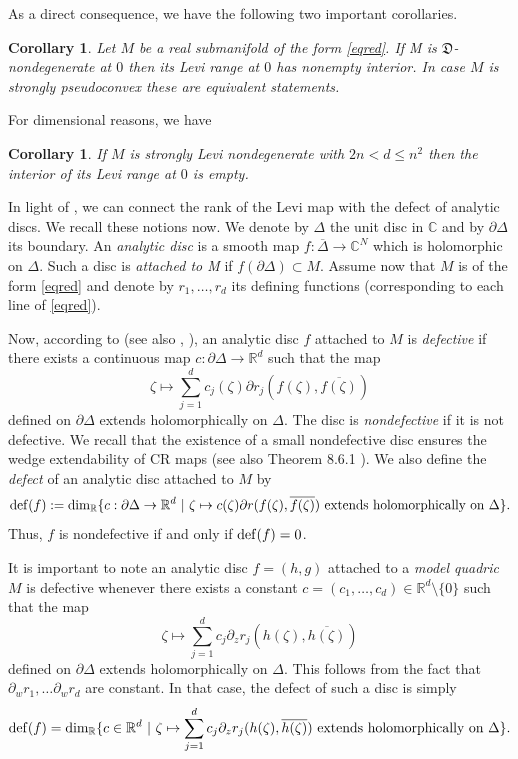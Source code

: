 \documentclass[12pt]{amsart}
\newcommand{\C}{\mathbb C}
\newcommand{\R}{\mathbb R}
\newtheorem{cor}[theo]{Corollary}
\theoremstyle{remark}
\theoremstyle{example}
\theoremstyle{definition}
\numberwithin{equation}{section}
\begin{document}
As a direct consequence, we have the following two important corollaries. 
\begin{cor}
Let  $M$ be a   real submanifold of the form \eqref{eqred}. If M is $\mathfrak{D}$-nondegenerate at $0$  then its Levi range at $0$ has nonempty interior. In case $M$ is strongly pseudoconvex these are equivalent statements.
\end{cor}

For dimensional reasons, we have
\begin{cor}
If $M$ is strongly Levi nondegenerate with $2n<d\leq n^2$ then  the interior of its Levi range at $0$ is empty.
\end{cor}




In light of \cite{be-me}, we can  connect the rank of the Levi map with the defect of analytic discs. We recall these notions now. We denote by $
\Delta$ the unit disc in $\C$ and by $\partial \Delta$ its boundary. An {\it analytic disc} is a smooth map $f: \overline{\Delta} \to \C^N$ which is holomorphic on $\Delta$. Such a disc is {\it attached to M} if $f(\partial \Delta) \subset M$. Assume now that $M$ is of the form \eqref{eqred} and denote by $r_1,\ldots,r_d$ its  defining functions (corresponding to each line of  \eqref{eqred}). 

Now, according to \cite{tu0} (see also \cite{ba-ro-tr}, \cite{ber}), an analytic disc $f$ attached to $M$ is {\it defective} if there exists a continuous 
map 
$c: \partial \Delta \to \R^{d}$ such that the map 
$$\zeta \mapsto \sum_{j=1}^d c_j(\zeta) \partial r_j(f(\zeta),\overline{f(\zeta)})$$
defined on $\partial \Delta$ extends holomorphically on $\Delta$. The disc is  {\it nondefective} if it is not defective. We recall that the existence of a small nondefective disc ensures the wedge extendability of CR maps  \cite{tu0} (see also Theorem 8.6.1 \cite{ber}).   
We also define the {\it defect} of an analytic  disc attached to $M$ by
$${\rm def}(f):={\rm dim}_\R \{c:\partial \Delta \to \R^d \ | \ \zeta \mapsto c(\zeta)\partial r(f(\zeta),\overline{f(\zeta)}) \mbox{ extends holomorphically on } \Delta\}.$$
Thus, $f$ is nondefective if and only if  ${\rm def}(f)=0$. 

It is important to note an analytic disc $f=(h,g)$ attached to a {\it model quadric} $M$ is defective whenever there exists a constant $c=(c_1,\ldots,c_d) \in \R^d\setminus\{0\}$ such that the map 
$$\zeta \mapsto  \sum_{j=1}^d c_j \partial_z r_j(h(\zeta),\overline{h(\zeta)})$$
defined on $\partial \Delta$ extends holomorphically on $\Delta$. This  follows from the fact that 
$\partial_w r_1,\ldots \partial_w r_d$ are constant. In that case, the defect of such a  disc is simply 
$${\rm def}(f)={\rm dim}_\R \{c \in \R^d \ | \ \zeta \mapsto  \sum_{j=1}^d c_j \partial_z r_j(h(\zeta),\overline{h(\zeta)}) \mbox{ extends holomorphically on } \Delta\}.$$
\end{document}

